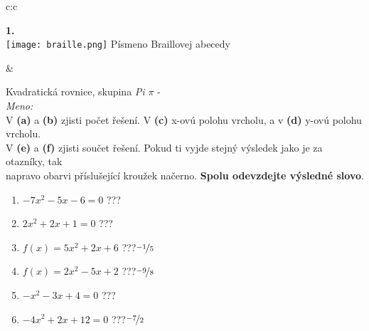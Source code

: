 \documentclass[10pt]{report}
\begin{document}
\begin{tabular}{c:c}
\begin{minipage}[c][99mm][t]{0.49\linewidth}
\begin{center}
\begin{minipage}{0.20\linewidth}
\begin{center}
{\Huge\bfseries 1.} \\[2mm]
\texttt{[image: braille.png]}
{\small Písmeno Braillovej abecedy}
\end{center}
\end{minipage}
\end{center}
\end{minipage}
&
\begin{minipage}[c][99mm][t]{0.49\linewidth}
\begin{center}
\vspace{7mm}
{\huge Kvadratická rovnice, skupina \textit{Pi $\pi$} -}\\[4.5mm]
\textit{Meno:}\phantom{xxxxxxxxxxxxxxxxxxxxxxxxxxxxxxxxxxxxxxxxxxxxxxxxxxxxxxxxxxxxxxxxx}\\[3.5mm]
V \textbf{(a)} a \textbf{(b)} zjisti počet řešení. V \textbf{(c)} x-ovú polohu vrcholu, a v \textbf{(d)} y-ovú polohu vrcholu.\\V \textbf{(e)} a \textbf{(f)} zjisti součet řešení. Pokud ti vyjde stejný výsledek jako je za otazníky, tak\\napravo obarvi příslušející kroužek načerno. \textbf{Spolu odevzdejte výsledné slovo}.\\[3mm]
\begin{minipage}{0.77\linewidth}
\begin{center}
\begin{varwidth}{\textwidth}
\begin{enumerate}
\large
\item $-7x^2-5x-6=0$\quad \dotfill\; ???\;\dotfill {}
\item $2x^2+2x+1=0$\quad \dotfill\; ???\;\dotfill {}
\item $f(x)=5x^2+2x+6$\quad \dotfill\; ???\;\dotfill \quad $\nicefrac{-1}{5}$
\item $f(x)=2x^2-5x+2$\quad \dotfill\; ???\;\dotfill \quad $\nicefrac{-9}{8}$
\item $-x^2-3x+4=0$\quad \dotfill\; ???\;\dotfill {}
\item $-4x^2+2x+12=0$\quad \dotfill\; ???\;\dotfill \quad $\nicefrac{-7}{2}$
\end{enumerate}
\end{varwidth}
\end{center}
\end{minipage}
\begin{minipage}{0.20\linewidth}
\begin{center}

\end{center}
\end{minipage}
\end{center}
\end{minipage}
\end{tabular}
\end{document}
